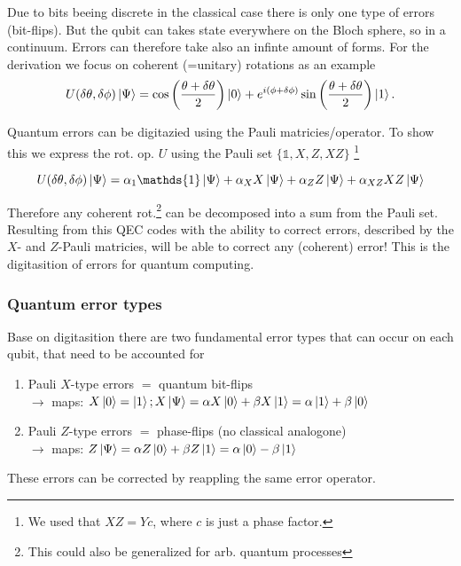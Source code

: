 Due to bits beeing discrete in the classical case there is only one type of errors (bit-flips). 
But the qubit can takes state everywhere on the Bloch sphere, so in a continuum. 
Errors can therefore take also an infinte amount of forms.
For the derivation we focus on coherent (=unitary) rotations as an example
\begin{equation}
    U(\delta \theta, \delta \phi) \ket{\Psi}=
    \cos\left(\frac{\theta + \delta \theta}{2}\right) \ket{0} +
    e^{i(\phi + \delta \phi)} 
    \sin\left(\frac{\theta + \delta \theta}{2}\right) \ket{1}.
\end{equation} 

Quantum errors can be digitazied using the Pauli matricies/operator. 
To show this we express the rot. op. $U$ using the Pauli set
$\{\mathds{1},{X},{Z},{XZ}\}$
\footnote{We used that $XZ=Yc$, where $c$ is just a phase factor.}

\begin{equation}
    U(\delta \theta, \delta \phi)\ket{\Psi} = 
    \alpha_1 \mathds{1} \ket{\Psi} +
    \alpha_X X \ket{\Psi}+
    \alpha_Z Z \ket{\Psi}+
    \alpha_{XZ} XZ \ket{\Psi}
\end{equation}

Therefore any coherent rot.\footnote{
    This could also be generalized for arb. quantum processes
} can be decomposed into a sum from the Pauli set. 
Resulting from this QEC codes with the ability to correct errors, 
described by the $X$- and $Z$-Pauli matricies, 
will be able to correct any (coherent) error!
This is the digitasition of errors for quantum computing. \cite{QECintro}


\subsubsection{Quantum error types}
Base on digitasition there are two fundamental error types that can occur on each qubit, 
that need to be accounted for \cite{QECintro}
\begin{enumerate}
    \item Pauli $X$-type errors $=$ quantum bit-flips \\
    $\rightarrow$ maps: $X\ket{0} = \ket{1}; X \ket{\Psi}= \alpha X \ket{0} + \beta X \ket{1} = \alpha  \ket{1} + \beta \ket{0}   $
    \item Pauli $Z$-type errors $=$ phase-flips (no classical analogone)\\
    $\rightarrow$ maps:  $Z \ket{\Psi}= \alpha Z \ket{0} + \beta Z \ket{1} = \alpha  \ket{0} - \beta \ket{1}   $
\end{enumerate}
These errors can be corrected by reappling the same error operator.

